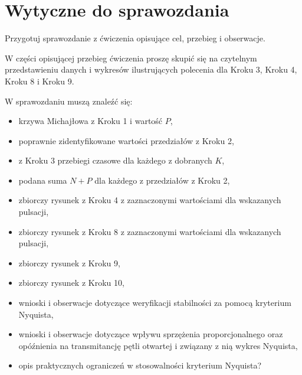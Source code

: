 \documentclass{sprawozdanie-agh}
\begin{document}
\section{Wytyczne do sprawozdania}

Przygotuj sprawozdanie z ćwiczenia opisujące cel, przebieg i obserwacje.

W części opisującej przebieg ćwiczenia proszę skupić się na czytelnym przedstawieniu danych i wykresów ilustrujących polecenia dla Kroku 3, Kroku 4, Kroku 8 i Kroku 9.


W sprawozdaniu muszą znaleźć się:
\begin{itemize}
    \item krzywa Michajłowa z Kroku 1 i wartość $P$,
    \item poprawnie zidentyfikowane wartości przedziałów z Kroku 2,
    \item z Kroku 3 przebiegi czasowe dla każdego z dobranych $K$,
    \item podana suma $N + P$ dla każdego z przedziałów z Kroku 2,
    \item zbiorczy rysunek z Kroku 4 z zaznaczonymi wartościami dla wskazanych pulsacji, 
    \item zbiorczy rysunek z Kroku 8 z zaznaczonymi wartościami dla wskazanych pulsacji,
    \item zbiorczy rysunek z Kroku 9,
    \item zbiorczy rysunek z Kroku 10,
    \item wnioski i obserwacje dotyczące weryfikacji stabilności za pomocą kryterium Nyquista,
    \item wnioski i obserwacje dotyczące wpływu sprzężenia proporcjonalnego oraz opóźnienia na transmitancję pętli otwartej i związany z nią wykres Nyquista,
    \item opis praktycznych ograniczeń w stosowalności kryterium Nyquista?
\end{itemize}
\end{document}

